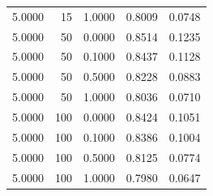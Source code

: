 \begin{longtable}{lrrrr}
5.0000 & 15 & 1.0000 & 0.8009 & 0.0748 \\
5.0000 & 50 & 0.0000 & 0.8514 & 0.1235 \\
5.0000 & 50 & 0.1000 & 0.8437 & 0.1128 \\
5.0000 & 50 & 0.5000 & 0.8228 & 0.0883 \\
5.0000 & 50 & 1.0000 & 0.8036 & 0.0710 \\
5.0000 & 100 & 0.0000 & 0.8424 & 0.1051 \\
5.0000 & 100 & 0.1000 & 0.8386 & 0.1004 \\
5.0000 & 100 & 0.5000 & 0.8125 & 0.0774 \\
5.0000 & 100 & 1.0000 & 0.7980 & 0.0647 \\
\end{longtable}
